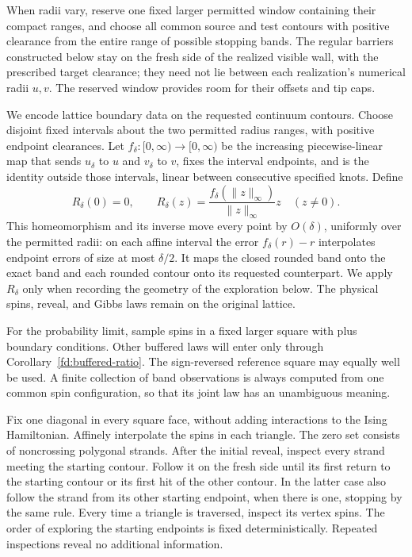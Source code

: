 \documentclass[11pt]{article}
\theoremstyle{definition}
\theoremstyle{remark}
\numberwithin{equation}{section}
\begin{document}
When radii vary, reserve one fixed larger permitted window containing
their compact ranges, and choose all common source and test contours
with positive clearance from the entire range of possible stopping
bands.  The regular barriers constructed below stay on the fresh side
of the realized visible wall, with the prescribed target clearance;
they need not lie between each realization's numerical radii $u,v$.
The reserved window provides room for their offsets and tip caps.

We encode lattice boundary data on the requested continuum contours.
Choose disjoint fixed intervals about the two permitted radius ranges,
with positive endpoint clearances. Let $f_\delta:[0,\infty)\to[0,\infty)$
be the increasing piecewise-linear map that sends $u_\delta$ to $u$ and
$v_\delta$ to $v$, fixes the interval endpoints, and is the identity
outside those intervals, linear between consecutive specified knots.
Define
\[
 R_\delta(0)=0,\qquad
 R_\delta(z)=\frac{f_\delta(\|z\|_\infty)}{\|z\|_\infty}z
 \quad(z\ne0).
\]
This homeomorphism and its inverse move every point by $O(\delta)$,
uniformly over the permitted radii: on each affine interval the error
$f_\delta(r)-r$ interpolates endpoint errors of size at most
$\delta/2$. It maps the closed rounded band onto the exact band and
each rounded contour onto its requested counterpart. We apply
$R_\delta$ only when recording the geometry of the exploration below.
The physical spins, reveal, and Gibbs laws remain on the original lattice.

For the probability limit, sample spins in a fixed larger square with
plus boundary conditions.  Other buffered laws will enter only through
Corollary~\ref{fd:buffered-ratio}.  The sign-reversed reference square may
equally well be used.  A finite collection of band observations is always
computed from one common spin configuration, so that its joint law has
an unambiguous meaning.

Fix one diagonal in every square face, without adding interactions to
the Ising Hamiltonian.  Affinely interpolate the spins in each triangle.
The zero set consists of noncrossing polygonal strands.  After the initial
reveal, inspect every strand meeting the starting contour.  Follow it on
the fresh side until its first return to the starting contour or its
first hit of the other contour.  In the latter case also follow the
strand from its other starting endpoint, when there is one, stopping by
the same rule.  Every time a triangle is traversed, inspect its vertex
spins.  The order of exploring the starting endpoints is fixed
deterministically.  Repeated inspections reveal no additional information.
\end{document}
